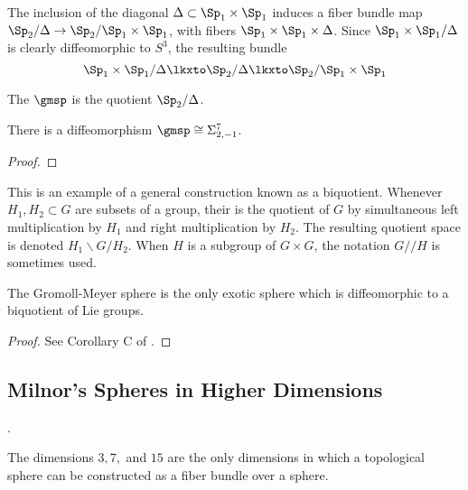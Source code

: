 The inclusion of the diagonal $\Delta \subset \Sp_1\times \Sp_1$ induces a fiber bundle map $\Sp_2/\Delta \to \Sp_2/\Sp_1\times \Sp_1$, with fibers $\Sp_1\times \Sp_1\times \Delta$. Since $\Sp_1\times \Sp_1/\Delta$ is clearly diffeomorphic to $S^3$, the resulting bundle
\[
	\Sp_1\times\Sp_1/\Delta \lkxto \Sp_2/\Delta \lkxto \Sp_2/\Sp_1\times \Sp_1
\]

\begin{definition}
	The  $\gmsp$ is the quotient $\Sp_2/\Delta$.
\end{definition}

\begin{proposition}
	There is a diffeomorphism $\gmsp \cong \Sigma^7_{2,-1}$.
\end{proposition}
\begin{proof}
\end{proof}


This is an example of a general construction known as a biquotient. Whenever $H_1,H_2\subset G$ are subsets of a group, their  is the quotient of $G$ by simultaneous left multiplication by $H_1$ and right multiplication by $H_2$. The resulting quotient space is denoted $H_1\backslash G/H_2$. When $H$ is a subgroup of $G\times G$, the notation $G/\!/H$ is sometimes used.

\begin{theorem}
	The Gromoll-Meyer sphere is the only exotic sphere which is diffeomorphic to a biquotient of Lie groups.
\end{theorem}
\begin{proof}
	See Corollary C of \cite{KZ2004biquotients}.
\end{proof}

\subsection{Milnor's Spheres in Higher Dimensions}

\cite{shimada1957differentiable}.




\begin{theorem}[Hopf]\label{thm:hopf-homotopy-spheres}
	The dimensions $3, 7,$ and $15$ are the only dimensions in which a topological sphere can be constructed as a fiber bundle over a sphere.
\end{theorem}
